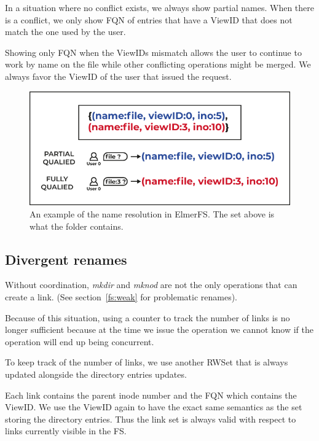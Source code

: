 \documentclass[sigconf,anonymous,10pt]{acmart}
\begin{document}
In a situation where no conflict exists, we always show partial names.
When there is a conflict, we only show FQN of entries that have a ViewID that
does not match the one used by the user.

Showing only FQN when the ViewIDs mismatch allows the user to continue to
work by name on the file while other conflicting operations might be merged.
We always favor the ViewID of the user that issued the request.


\begin{figure}[h]
	\caption{An example of the name resolution in ElmerFS. The set above is
	         what the folder contains.}
	\centering
	\includegraphics[scale=0.6]{Le-bonhomme-sait-pas-ce-quil-veut.pdf}
\end{figure}


\subsection{Divergent renames}

Without coordination, \textit{mkdir} and \textit{mknod} are not the only
operations that can create a link. (See section~\ref{fs:weak} for problematic
renames).

Because of this situation, using a counter to track the number of links is no
longer sufficient because at the time we issue the  operation
we cannot know if the operation will end up being concurrent.

To keep track of the number of links, we use another RWSet that is
always updated alongside the directory entries updates.

Each link contains the parent inode number and the FQN which contains
the ViewID.
We use the ViewID again to have the exact same semantics as the set storing
the directory entries. Thus the link set is always valid with respect to
links currently visible in the FS.
\end{document}
